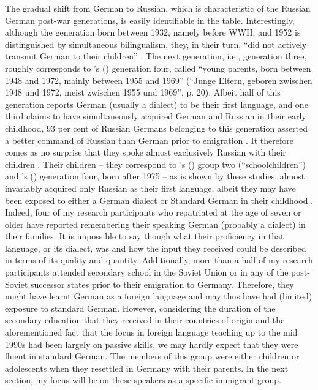 The gradual shift from German to Russian, which is characteristic of the Russian German post-war generations, is easily identifiable in the table. Interestingly, although the generation born between 1932, namely before WWII, and 1952 is distinguished by simultaneous bilingualism, they, in their turn, ``did not actively transmit German to their children'' \citep[22]{riehlTA}. The next generation, i.e., generation three, roughly corresponds to \citeauthor{meng01}'s (\citeyear{meng01}) generation four, called ``young parents, born between 1948 and 1972, mainly between 1955 and 1969'' (``Junge Eltern, geboren zwischen 1948 und 1972, meist zwischen 1955 und 1969'', p. 20). Albeit half of this generation reports German (usually a dialect) to be their first language, and one third claims to have simultaneously acquired German and Russian in their early childhood, 93 per cent of Russian Germans belonging to this generation asserted a better command of Russian than German prior to emigration \citep[36]{meng01}. It therefore comes as no surprise that they spoke almost exclusively Russian with their children \citep[35]{meng01}. Their children -- they correspond to \citeauthor{meng01}'s (\citeyear{meng01}) group two (“schoolchildren”) and \citeauthor{riehlTA}'s (\citeyear{riehlTA}) generation four, born after 1975 -- as is shown by these studies, almost invariably acquired only Russian as their first language, albeit they may have been exposed to either a German dialect or Standard German in their childhood \citep[cf.][35]{meng01}. Indeed, four of my research participants who repatriated at the age of seven or older have reported remembering their speaking German (probably a dialect) in their families. It is impossible to say though what their proficiency in that language, or its dialect, was and how the input they received could be described in terms of its quality and quantity. Additionally, more than a half of my research participants attended secondary school in the Soviet Union or in any of the post-Soviet successor states prior to their emigration to Germany. Therefore, they might have learnt German as a foreign language and may thus have had (limited) exposure to standard German. However, considering the duration of the secondary education that they received in their countries of origin and the aforementioned fact that the focus in foreign language teaching up to the mid 1990s had been largely on passive skills, we may hardly expect that they were fluent in standard German. The members of this group were either children or adolescents when they resettled in Germany with their parents. In the next section, my focus will be on these speakers as a specific immigrant group.

